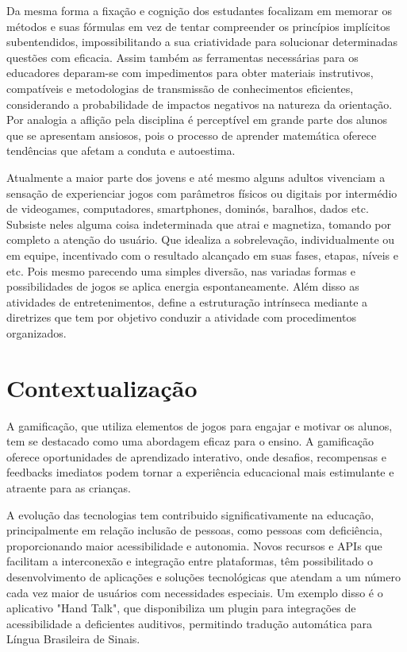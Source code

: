 Da mesma forma a fixação e cognição dos estudantes focalizam em memorar os métodos e suas fórmulas em vez de tentar compreender os princípios implícitos subentendidos, impossibilitando a sua criatividade para solucionar determinadas questões com eficacia. Assim também as ferramentas necessárias para os educadores deparam-se com impedimentos para obter materiais instrutivos, compatíveis e metodologias de transmissão de conhecimentos eficientes, considerando a probabilidade de impactos negativos na natureza da orientação. Por analogia a aflição pela disciplina é perceptível em grande parte dos alunos que se apresentam ansiosos, pois o processo de aprender matemática oferece tendências que afetam a conduta e autoestima. 

Atualmente a maior parte dos jovens e até mesmo alguns adultos vivenciam a sensação de experienciar jogos com parâmetros físicos ou digitais por intermédio de videogames, computadores, smartphones, dominós, baralhos, dados etc. Subsiste neles alguma coisa indeterminada que atrai e magnetiza, tomando por completo a atenção do usuário. Que idealiza a sobrelevação, individualmente ou em equipe, incentivado com o resultado alcançado em suas fases, etapas, níveis e etc. Pois mesmo parecendo uma simples diversão, nas variadas formas e possibilidades de jogos se aplica energia espontaneamente. Além disso as atividades de entretenimentos, define a estruturação intrínseca mediante a diretrizes que tem por objetivo conduzir a atividade com procedimentos organizados.

\section{Contextualização}

A gamificação, que utiliza elementos de jogos para engajar e motivar os alunos, tem se destacado como uma abordagem eficaz para o ensino. A gamificação oferece oportunidades de aprendizado interativo, onde desafios, recompensas e feedbacks imediatos podem tornar a experiência educacional mais estimulante e atraente para as crianças.

A evolução das tecnologias tem contribuido significativamente na educação, principalmente em relação inclusão de pessoas, como pessoas com deficiência, proporcionando maior acessibilidade e autonomia.  Novos recursos e APIs que facilitam a interconexão e integração entre plataformas, têm possibilitado o desenvolvimento de aplicações e soluções tecnológicas que atendam a um número cada vez maior de usuários com necessidades especiais. Um exemplo disso é o aplicativo "Hand Talk", que disponibiliza um plugin para integrações de acessibilidade a deficientes auditivos, permitindo tradução automática para Língua Brasileira de Sinais.

